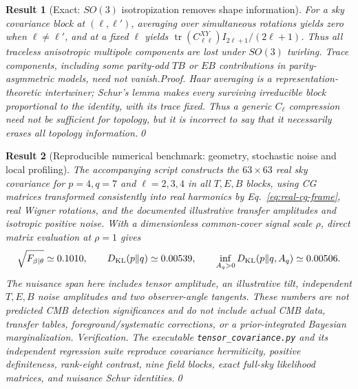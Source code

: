 \documentclass[aps,prd,onecolumn,notitlepage,groupedaddress,11pt]{revtex4-2}
\newtheorem{result}{Result}
\begin{document}
\begin{result}[\textsf{Exact}: $SO(3)$ isotropization removes shape information]\label{new:216}
For a sky covariance block at $(\ell,\ell')$, averaging over simultaneous rotations yields zero when $\ell\ne\ell'$, and at a fixed $\ell$ yields $\operatorname{tr}(C_{\ell\ell}^{XY})I_{2\ell+1}/(2\ell+1)$. Thus all traceless anisotropic multipole components are lost under $SO(3)$ twirling. Trace components, including some parity-odd $TB$ or $EB$ contributions in parity-asymmetric models, need not vanish.\textit{Proof.} Haar averaging is a representation-theoretic intertwiner; Schur's lemma makes every surviving irreducible block proportional to the identity, with its trace fixed. Thus a generic $C_\ell$ compression need not be sufficient for topology, but it is incorrect to say that it necessarily erases \emph{all} topology information.\qed
\end{result}

\begin{result}[\textsf{Reproducible numerical benchmark}: geometry, stochastic noise and local profiling]\label{new:217}
The accompanying script constructs the $63\times63$ real sky covariance for $p=4,q=7$ and $\ell=2,3,4$ in all $T,E,B$ blocks, using CG matrices transformed consistently into real harmonics by Eq.~\eqref{eq:real-cg-frame}, real Wigner rotations, and the documented \emph{illustrative} transfer amplitudes and isotropic positive noise. With a dimensionless common-cover signal scale $\rho$, direct matrix evaluation at $\rho=1$ gives
\begin{equation}\label{eq:numbers}
\sqrt{F_{\beta\mid\theta}}\simeq0.1010,\qquad
D_{\rm KL}(p\Vert q)\simeq0.00539,\qquad
\inf_{A_q>0}D_{\rm KL}(p\Vert q,A_q)\simeq0.00506.
\end{equation}
The nuisance span here includes tensor amplitude, an illustrative tilt, independent $T,E,B$ noise amplitudes and two observer-angle tangents. These numbers are \emph{not} predicted CMB detection significances and do not include actual CMB data, transfer tables, foreground/systematic corrections, or a prior-integrated Bayesian marginalization. \textit{Verification.} The executable \texttt{tensor\_covariance.py} and its independent regression suite reproduce covariance hermiticity, positive definiteness, rank-eight contrast, nine field blocks, exact full-sky likelihood matrices, and nuisance Schur identities.\qed
\end{result}
\end{document}
